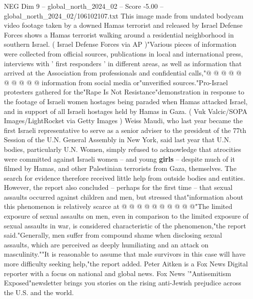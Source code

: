 \begin{textsample}{NEG Dim 9 – global\_north\_2024\_02 – Score -5.00 – global\_north\_2024\_02/106102107.txt}
This image made from undated bodycam video footage taken by a downed Hamas terrorist and released by Israel Defense Forces shows a Hamas terrorist walking around a residential neighborhood in southern Israel. ( Israel Defense Forces via AP )"Various pieces of information were collected from official sources, publications in local and international press, interviews with ' first responders ' in different areas, as well as information that arrived at the Association from professionals and confidential calls,"@ @ @ @ @ @ @ @ @ @ information from social media or"unverified sources."Pro-Israel protesters gathered for the"Rape Is Not Resistance"demonstration in response to the footage of Israeli women hostages being paraded when Hamas attacked Israel, and in support of all Israeli hostages held by Hamas in Gaza. ( Vuk Valcic/SOPA Images/LightRocket via Getty Images ) Weiss Maudi, who last year became the first Israeli representative to serve as a senior adviser to the president of the 77th Session of the U.N.
General Assembly in New York, said last year that U.N. bodies, particularly U.N.
Women, simply refused to acknowledge that atrocities were committed against Israeli women -- and young \textbf{girls} -- despite much of it filmed by Hamas, and other Palestinian terrorists from Gaza, themselves.
The search for evidence therefore received little help from outside bodies and entities.
However, the report also concluded -- perhaps for the first time -- that sexual assaults occurred against children and men, but stressed that"information about this phenomenon is relatively scarce at @ @ @ @ @ @ @ @ @ @"The limited exposure of sexual assaults on men, even in comparison to the limited exposure of sexual assaults in war, is considered characteristic of the phenomenon,"the report said."Generally, men suffer from compound shame when disclosing sexual assaults, which are perceived as deeply humiliating and an attack on masculinity.""It is reasonable to assume that male survivors in this case will have more difficulty seeking help,"the report added.
Peter Aitken is a Fox News Digital reporter with a focus on national and global news.
Fox News '"Antisemitism Exposed"newsletter brings you stories on the rising anti-Jewish prejudice across the U.S. and the world.

\end{textsample}
